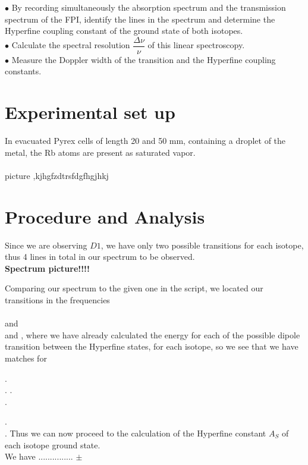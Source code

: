 \documentclass[openany,11pt,a4paper]{book}
\begin{document}
$\bullet$ By recording simultaneously the absorption spectrum and the transmission spectrum of the FPI, identify the lines in the spectrum and determine the Hyperfine coupling constant of the ground state of both isotopes.\\ 

$\bullet$ Calculate the spectral resolution $\dfrac{\Delta \nu}{\nu}$ of this linear spectroscopy.\\


$\bullet $ Measure the Doppler width of the transition and the Hyperfine coupling constants.\\



\section*{ Experimental set up}


In evacuated Pyrex cells of length 20 and 50 mm, containing a droplet of the metal, the Rb atoms are present as saturated vapor.\\\\


picture ,kjhgfzdtrsfdgfhgjhkj




\section*{Procedure and Analysis}


Since we are observing $D1$, we have only two possible transitions for each isotope, thus 4 lines in total in our spectrum to be observed.\\

\textbf{Spectrum picture!!!!}


Comparing our spectrum to the given one in the script, we located our transitions in the frequencies \\
\\ and \\
and
, where we have already calculated the energy for each of the possible dipole transition between the Hyperfine states, for each isotope, so we see that we have matches for 

.\\
.
.\\

.

.\\

.
Thus we can now proceed to the calculation of the Hyperfine constant $A_{S}$ of each isotope ground state.\\
  We have ...............
  $\pm$
\end{document}

